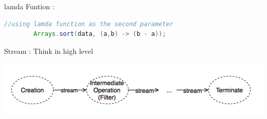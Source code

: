 \documentclass[twoside]{article}
\begin{document}
	lamda Funtion :

	\begin{center}
		\begin{lstlisting}[language=Java]
		//using lamda function as the second parameter
		Arrays.sort(data, (a,b) -> (b - a)); 
		\end{lstlisting}
	\end{center}

	Stream : Think in high level
	\begin{center}
		\includegraphics[scale=0.7]{stream.png}
	\end{center}


	
\end{document}
